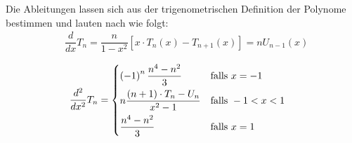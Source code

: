Die Ableitungen lassen sich aus der trigenometrischen Definition der Polynome bestimmen und lauten nach \citet{spanier-1987} wie folgt:
\begin{align}
& \dfrac{d}{dx} T_n = \dfrac{n}{1-x^2} \left[ x \cdot T_n \left( x \right) - T_{n+1} \left( x \right) \right] = nU_{n-1} \left( x \right)
\end{align} 

\begin{align}
& \dfrac{d^2}{dx^2} T_n = 
  \begin{dcases} 
   \left(-1\right)^{n} \dfrac{n^4 - n^2}{3}  & \text{falls } x = -1 \\
   n \dfrac{(n+1) \cdot T_n - U_n}{x^2 - 1} & \text{falls } -1 < x < 1 \\
   \dfrac{n^4 - n^2}{3}                      & \text{falls } x = 1
  \end{dcases}
\end{align} 


